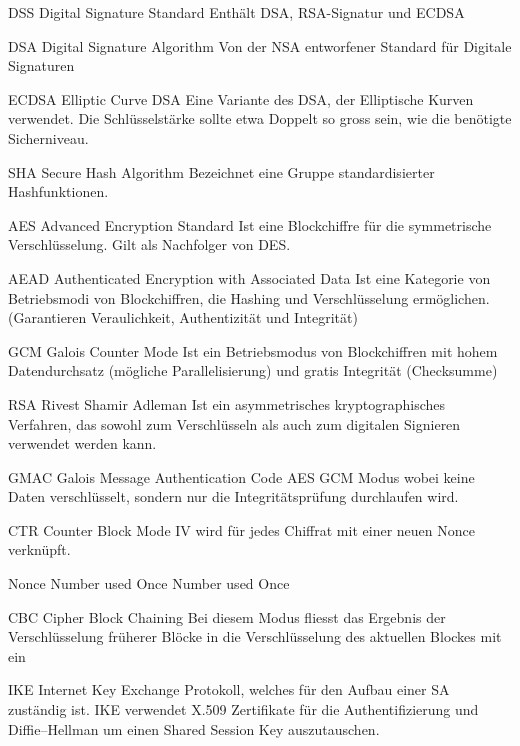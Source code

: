 {DSS}
{Digital Signature Standard}
{
	Enthält DSA, RSA-Signatur und ECDSA
}

{DSA}
{Digital Signature Algorithm}
{
	Von der NSA entworfener Standard für Digitale Signaturen
}

{ECDSA}
{Elliptic Curve DSA}
{
	Eine Variante des DSA, der Elliptische Kurven verwendet. Die Schlüsselstärke sollte etwa Doppelt so gross sein, wie die benötigte Sicherniveau.
}

{SHA}
{Secure Hash Algorithm}
{
	Bezeichnet eine Gruppe standardisierter Hashfunktionen.
}

{AES}
{Advanced Encryption Standard}
{
	Ist eine Blockchiffre für die symmetrische Verschlüsselung. Gilt als Nachfolger von DES.
}

{AEAD}
{Authenticated Encryption with Associated Data}
{
	Ist eine Kategorie von Betriebsmodi von Blockchiffren, die Hashing und Verschlüsselung ermöglichen. (Garantieren Veraulichkeit, Authentizität und Integrität)
}

{GCM}
{Galois Counter Mode}
{
	Ist ein Betriebsmodus von Blockchiffren mit hohem Datendurchsatz (mögliche Parallelisierung) und gratis Integrität (Checksumme)
}


{RSA}
{Rivest Shamir Adleman}
{
	Ist ein asymmetrisches kryptographisches Verfahren, das sowohl zum Verschlüsseln als auch zum digitalen Signieren verwendet werden kann.
}

{GMAC}
{Galois Message Authentication Code}
{
	AES GCM Modus wobei keine Daten verschlüsselt, sondern nur die Integritätsprüfung durchlaufen wird.
}

{CTR}
{Counter Block Mode}
{
	IV wird für jedes Chiffrat mit einer neuen Nonce verknüpft.
}

{Nonce}
{Number used Once}
{
	Number used Once
}

{CBC}
{Cipher Block Chaining}
{
	Bei diesem Modus fliesst das Ergebnis der Verschlüsselung früherer Blöcke in die Verschlüsselung des aktuellen Blockes mit ein
}


{IKE}
{Internet Key Exchange}
{
	Protokoll, welches für den Aufbau einer SA zuständig ist. IKE verwendet X.509 Zertifikate für die Authentifizierung und Diffie–Hellman um einen Shared Session Key auszutauschen.
}

